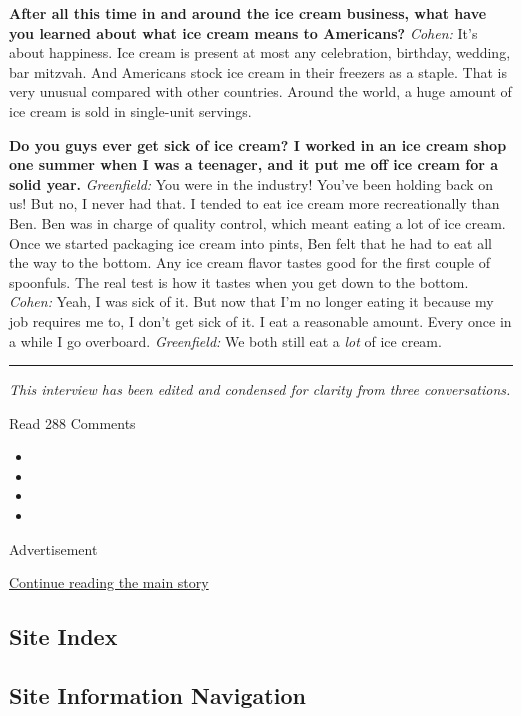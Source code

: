 \textbf{After all this time in and around the ice cream business, what
have you learned about what ice cream means to Americans?} \emph{Cohen:}
It's about happiness. Ice cream is present at most any celebration,
birthday, wedding, bar mitzvah. And Americans stock ice cream in their
freezers as a staple. That is very unusual compared with other
countries. Around the world, a huge amount of ice cream is sold in
single-unit servings.

\textbf{Do you guys ever get sick of ice cream? I worked in an ice cream
shop one summer when I was a teenager, and it put me off ice cream for a
solid year.} \emph{Greenfield:} You were in the industry! You've been
holding back on us! But no, I never had that. I tended to eat ice cream
more recreationally than Ben. Ben was in charge of quality control,
which meant eating a lot of ice cream. Once we started packaging ice
cream into pints, Ben felt that he had to eat all the way to the bottom.
Any ice cream flavor tastes good for the first couple of spoonfuls. The
real test is how it tastes when you get down to the bottom.
\emph{Cohen:} Yeah, I was sick of it. But now that I'm no longer eating
it because my job requires me to, I don't get sick of it. I eat a
reasonable amount. Every once in a while I go overboard.
\emph{Greenfield:} We both still eat a \emph{lot} of ice cream.

\begin{center}\rule{0.5\linewidth}{\linethickness}\end{center}

\emph{This interview has been edited and condensed for clarity from
three conversations.}

Read 288 Comments

\begin{itemize}
\item
\item
\item
\item
\end{itemize}

Advertisement

\protect\hyperlink{after-bottom}{Continue reading the main story}

\hypertarget{site-index}{%
\subsection{Site Index}\label{site-index}}

\hypertarget{site-information-navigation}{%
\subsection{Site Information
Navigation}\label{site-information-navigation}}

